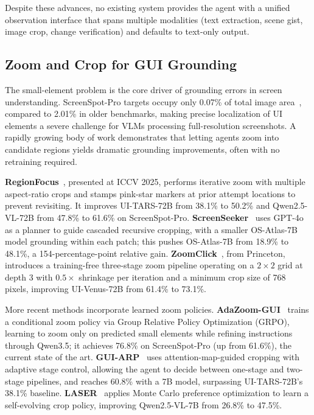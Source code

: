 \documentclass[11pt,a4paper]{article}
\begin{document}
Despite these advances, no existing system provides the agent with a unified observation interface that spans multiple modalities (text extraction, scene gist, image crop, change verification) and defaults to text-only output.

\subsection{Zoom and Crop for GUI Grounding}
\label{sec:rw-zoom-crop}

The small-element problem is the core driver of grounding errors in screen understanding. ScreenSpot-Pro targets occupy only 0.07\% of total image area~\cite{screenspot-pro}, compared to 2.01\% in older benchmarks, making precise localization of UI elements a severe challenge for VLMs processing full-resolution screenshots. A rapidly growing body of work demonstrates that letting agents zoom into candidate regions yields dramatic grounding improvements, often with no retraining required.

\textbf{RegionFocus}~\cite{regionfocus}, presented at ICCV 2025, performs iterative zoom with multiple aspect-ratio crops and stamps pink-star markers at prior attempt locations to prevent revisiting. It improves UI-TARS-72B from 38.1\% to 50.2\% and Qwen2.5-VL-72B from 47.8\% to 61.6\% on ScreenSpot-Pro. \textbf{ScreenSeeker}~\cite{screenseeker} uses GPT-4o as a planner to guide cascaded recursive cropping, with a smaller OS-Atlas-7B model grounding within each patch; this pushes OS-Atlas-7B from 18.9\% to 48.1\%, a 154-percentage-point relative gain. \textbf{ZoomClick}~\cite{zoomclick}, from Princeton, introduces a training-free three-stage zoom pipeline operating on a $2 \times 2$ grid at depth 3 with $0.5\times$ shrinkage per iteration and a minimum crop size of 768 pixels, improving UI-Venus-72B from 61.4\% to 73.1\%.

More recent methods incorporate learned zoom policies. \textbf{AdaZoom-GUI}~\cite{adazoom-gui} trains a conditional zoom policy via Group Relative Policy Optimization (GRPO), learning to zoom only on predicted small elements while refining instructions through Qwen3.5; it achieves 76.8\% on ScreenSpot-Pro (up from 61.6\%), the current state of the art. \textbf{GUI-ARP}~\cite{gui-arp} uses attention-map-guided cropping with adaptive stage control, allowing the agent to decide between one-stage and two-stage pipelines, and reaches 60.8\% with a 7B model, surpassing UI-TARS-72B's 38.1\% baseline. \textbf{LASER}~\cite{laser} applies Monte Carlo preference optimization to learn a self-evolving crop policy, improving Qwen2.5-VL-7B from 26.8\% to 47.5\%.
\end{document}
